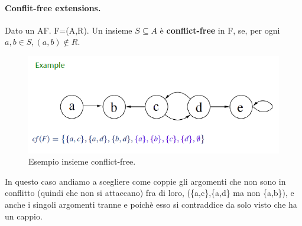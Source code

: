 \paragraph{Conflit-free extensions.} Dato un AF. F=(A,R). Un insieme $S\subseteq A$ è \textbf{conflict-free} in F, se, per ogni $a,b \in S ,(a,b) \notin R$.
\begin{figure}[H]
    \centering
    \includegraphics[width=13cm, keepaspectratio]{img/es_conflict_free.png}
    \caption{Esempio insieme conflict-free.}\label{fig:es_conflict_free}
\end{figure}
In questo caso andiamo a scegliere come coppie gli argomenti che non sono in conflitto (quindi che non si attaccano) fra di loro, (\{a,c\},\{a,d\} ma non \{a,b\}), e anche i singoli argomenti tranne e poichè esso si contraddice da solo visto che ha un cappio. 

